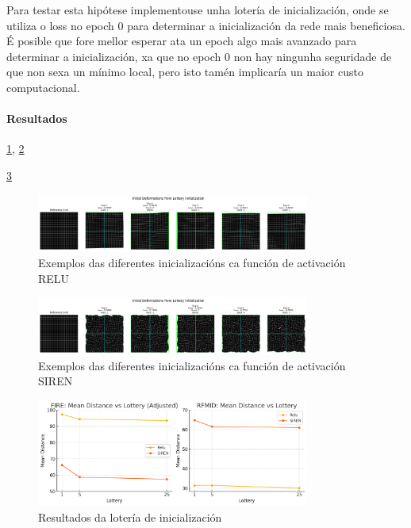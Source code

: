 Para testar esta hipótese implementouse unha lotería de inicialización, onde se utiliza o loss no epoch 0 para determinar a inicialización da rede mais beneficiosa.
É posible que fore mellor esperar ata un epoch algo mais avanzado para determinar a inicialización, xa que no epoch 0 non hay ningunha seguridade de que non sexa un mínimo local, pero isto tamén implicaría un maior custo computacional.

\paragraph{Resultados}
\label{par:Resultados-initialization}

\ref{fig:lottery_initial_deformations_combinedMLP}, \ref{fig:lottery_initial_deformations_combinedSIREN}

\ref{fig:lottery}

\begin{figure}[ht]
    \centering
    \includegraphics[width=0.8\textwidth]{imaxes/lottery/initial_deformations_combinedMLP.png}
    \caption{Exemplos das diferentes inicializacións ca función de activación RELU}
    \label{fig:lottery_initial_deformations_combinedMLP}
\end{figure}

\begin{figure}[ht]
    \centering
    \includegraphics[width=0.8\textwidth]{imaxes/lottery/initial_deformations_combinedSIREN.png}
    \caption{Exemplos das diferentes inicializacións ca función de activación SIREN}
    \label{fig:lottery_initial_deformations_combinedSIREN}
\end{figure}


\begin{figure}[ht]
    \centering
    \includegraphics[width=0.8\textwidth]{imaxes/lottery/lotery.png}
    \caption{Resultados da lotería de inicialización}
    \label{fig:lottery}
\end{figure}

